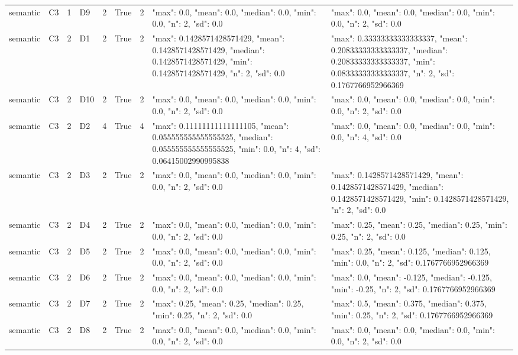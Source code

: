 \begin{tabular}{lllllllll}
semantic & C3 & 1 & D9 & 2 & True & 2 & {"max": 0.0, "mean": 0.0, "median": 0.0, "min": 0.0, "n": 2, "sd": 0.0} & {"max": 0.0, "mean": 0.0, "median": 0.0, "min": 0.0, "n": 2, "sd": 0.0} \\
semantic & C3 & 2 & D1 & 2 & True & 2 & {"max": 0.1428571428571429, "mean": 0.1428571428571429, "median": 0.1428571428571429, "min": 0.1428571428571429, "n": 2, "sd": 0.0} & {"max": 0.33333333333333337, "mean": 0.20833333333333337, "median": 0.20833333333333337, "min": 0.08333333333333337, "n": 2, "sd": 0.1767766952966369} \\
semantic & C3 & 2 & D10 & 2 & True & 2 & {"max": 0.0, "mean": 0.0, "median": 0.0, "min": 0.0, "n": 2, "sd": 0.0} & {"max": 0.0, "mean": 0.0, "median": 0.0, "min": 0.0, "n": 2, "sd": 0.0} \\
semantic & C3 & 2 & D2 & 4 & True & 4 & {"max": 0.11111111111111105, "mean": 0.055555555555555525, "median": 0.055555555555555525, "min": 0.0, "n": 4, "sd": 0.06415002990995838} & {"max": 0.0, "mean": 0.0, "median": 0.0, "min": 0.0, "n": 4, "sd": 0.0} \\
semantic & C3 & 2 & D3 & 2 & True & 2 & {"max": 0.0, "mean": 0.0, "median": 0.0, "min": 0.0, "n": 2, "sd": 0.0} & {"max": 0.1428571428571429, "mean": 0.1428571428571429, "median": 0.1428571428571429, "min": 0.1428571428571429, "n": 2, "sd": 0.0} \\
semantic & C3 & 2 & D4 & 2 & True & 2 & {"max": 0.0, "mean": 0.0, "median": 0.0, "min": 0.0, "n": 2, "sd": 0.0} & {"max": 0.25, "mean": 0.25, "median": 0.25, "min": 0.25, "n": 2, "sd": 0.0} \\
semantic & C3 & 2 & D5 & 2 & True & 2 & {"max": 0.0, "mean": 0.0, "median": 0.0, "min": 0.0, "n": 2, "sd": 0.0} & {"max": 0.25, "mean": 0.125, "median": 0.125, "min": 0.0, "n": 2, "sd": 0.1767766952966369} \\
semantic & C3 & 2 & D6 & 2 & True & 2 & {"max": 0.0, "mean": 0.0, "median": 0.0, "min": 0.0, "n": 2, "sd": 0.0} & {"max": 0.0, "mean": -0.125, "median": -0.125, "min": -0.25, "n": 2, "sd": 0.1767766952966369} \\
semantic & C3 & 2 & D7 & 2 & True & 2 & {"max": 0.25, "mean": 0.25, "median": 0.25, "min": 0.25, "n": 2, "sd": 0.0} & {"max": 0.5, "mean": 0.375, "median": 0.375, "min": 0.25, "n": 2, "sd": 0.1767766952966369} \\
semantic & C3 & 2 & D8 & 2 & True & 2 & {"max": 0.0, "mean": 0.0, "median": 0.0, "min": 0.0, "n": 2, "sd": 0.0} & {"max": 0.0, "mean": 0.0, "median": 0.0, "min": 0.0, "n": 2, "sd": 0.0} \\

\end{tabular}

